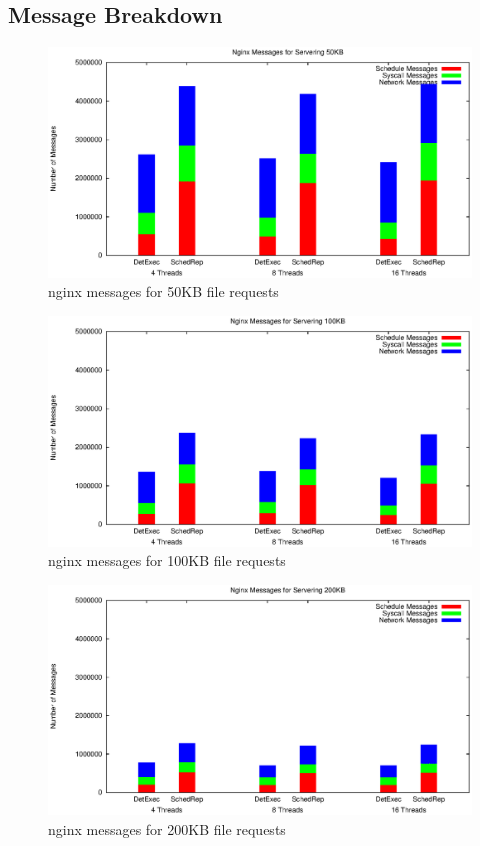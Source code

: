 \subsection{Message Breakdown}
\begin{figure}
\centering
\includegraphics[width=0.8\columnwidth]{figures/ng_msg_50k}
\caption{nginx messages for 50KB file requests}
\label{f:ng_msg_50k}
\end{figure}
\begin{figure}
\centering
\includegraphics[width=0.8\columnwidth]{figures/ng_msg_100KB}
\caption{nginx messages for 100KB file requests}
\label{f:ng_msg_100k}
\end{figure}
\begin{figure}
\centering
\includegraphics[width=0.8\columnwidth]{figures/ng_msg_200KB}
\caption{nginx messages for 200KB file requests}
\label{f:ng_msg_200k}
\end{figure}
